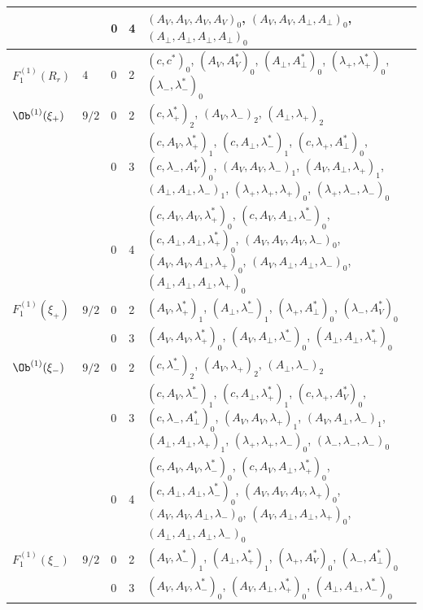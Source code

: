 {\begin{longtable}{>{\raggedright}p{2.3cm}|p{0.6cm}|p{0.25cm}|p{0.25cm}|>{\raggedright\arraybackslash}p{11.6cm}}
 &  & 0 & 4 & $(A_V,A_V,A_V,A_V)_{0}$, $(A_V,A_V,A_\perp,A_\perp)_{0}$, $(A_\perp,A_\perp,A_\perp,A_\perp)_{0}$ \\
\hline
$F_1^{(1)}(R_r)$ & $4$ & 0 & 2 & $(c,c^*)_{0}$, $(A_V,A^*_V)_{0}$, $(A_\perp,A^*_\perp)_{0}$, $(\lambda_+,\lambda^*_+)_{0}$, $(\lambda_-,\lambda^*_-)_{0}$ \\
\hline
$\Ob^{(1)}(\xi_+)$ & $9/2$ & 0 & 2 & $(c,\lambda^*_+)_{2}$, $(A_V,\lambda_-)_{2}$, $(A_\perp,\lambda_+)_{2}$ \\
 &  & 0 & 3 & $(c,A_V,\lambda^*_+)_{1}$, $(c,A_\perp,\lambda^*_-)_{1}$, $(c,\lambda_+,A^*_\perp)_{0}$, $(c,\lambda_-,A^*_V)_{0}$, $(A_V,A_V,\lambda_-)_{1}$, $(A_V,A_\perp,\lambda_+)_{1}$, $(A_\perp,A_\perp,\lambda_-)_{1}$, $(\lambda_+,\lambda_+,\lambda_+)_{0}$, $(\lambda_+,\lambda_-,\lambda_-)_{0}$ \\
 &  & 0 & 4 & $(c,A_V,A_V,\lambda^*_+)_{0}$, $(c,A_V,A_\perp,\lambda^*_-)_{0}$, $(c,A_\perp,A_\perp,\lambda^*_+)_{0}$, $(A_V,A_V,A_V,\lambda_-)_{0}$, $(A_V,A_V,A_\perp,\lambda_+)_{0}$, $(A_V,A_\perp,A_\perp,\lambda_-)_{0}$, $(A_\perp,A_\perp,A_\perp,\lambda_+)_{0}$ \\
\hline
$F_1^{(1)}(\xi_+)$ & $9/2$ & 0 & 2 & $(A_V,\lambda^*_+)_{1}$, $(A_\perp,\lambda^*_-)_{1}$, $(\lambda_+,A^*_\perp)_{0}$, $(\lambda_-,A^*_V)_{0}$ \\
 &  & 0 & 3 & $(A_V,A_V,\lambda^*_+)_{0}$, $(A_V,A_\perp,\lambda^*_-)_{0}$, $(A_\perp,A_\perp,\lambda^*_+)_{0}$ \\
\hline
$\Ob^{(1)}(\xi_-)$ & $9/2$ & 0 & 2 & $(c,\lambda^*_-)_{2}$, $(A_V,\lambda_+)_{2}$, $(A_\perp,\lambda_-)_{2}$ \\
 &  & 0 & 3 & $(c,A_V,\lambda^*_-)_{1}$, $(c,A_\perp,\lambda^*_+)_{1}$, $(c,\lambda_+,A^*_V)_{0}$, $(c,\lambda_-,A^*_\perp)_{0}$, $(A_V,A_V,\lambda_+)_{1}$, $(A_V,A_\perp,\lambda_-)_{1}$, $(A_\perp,A_\perp,\lambda_+)_{1}$, $(\lambda_+,\lambda_+,\lambda_-)_{0}$, $(\lambda_-,\lambda_-,\lambda_-)_{0}$ \\
 &  & 0 & 4 & $(c,A_V,A_V,\lambda^*_-)_{0}$, $(c,A_V,A_\perp,\lambda^*_+)_{0}$, $(c,A_\perp,A_\perp,\lambda^*_-)_{0}$, $(A_V,A_V,A_V,\lambda_+)_{0}$, $(A_V,A_V,A_\perp,\lambda_-)_{0}$, $(A_V,A_\perp,A_\perp,\lambda_+)_{0}$, $(A_\perp,A_\perp,A_\perp,\lambda_-)_{0}$ \\
\hline
$F_1^{(1)}(\xi_-)$ & $9/2$ & 0 & 2 & $(A_V,\lambda^*_-)_{1}$, $(A_\perp,\lambda^*_+)_{1}$, $(\lambda_+,A^*_V)_{0}$, $(\lambda_-,A^*_\perp)_{0}$ \\
 &  & 0 & 3 & $(A_V,A_V,\lambda^*_-)_{0}$, $(A_V,A_\perp,\lambda^*_+)_{0}$, $(A_\perp,A_\perp,\lambda^*_-)_{0}$ \\

\end{longtable}}

